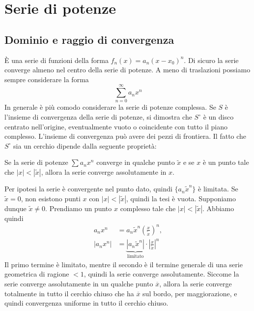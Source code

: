 \documentclass[a4paper]{article}
\begin{document}
\pagebreak

\section{Serie di potenze}

\subsection{Dominio e raggio di convergenza}

\begin{radioactive}
È una serie di funzioni della forma \(f_n(x) = a_n(x-x_0)^n\).
Di sicuro la serie converge almeno nel centro della serie di potenze.
A meno di traslazioni possiamo sempre considerare la forma
\[
    \sum_{n=0}^\infty a_n x^n
\]
In generale è più comodo considerare la serie di potenze complessa.
Se \(S\) è l'insieme di convergenza della serie di potenze,
si dimostra che \(S^\circ\) è un disco centrato nell'origine, eventualmente vuoto o coincidente con tutto il piano complesso.
L'insieme di convergenza può avere dei pezzi di frontiera.
Il fatto che \(S^\circ\)
sia un cerchio dipende dalla seguente proprietà:
\end{radioactive}

\begin{radioactive}
\begin{snippetproposition}{}
    Se la serie di potenze \(\sum a_nx^n\) converge in qualche punto \(\tilde x\)
    e se \(x\) è un punto tale che \(|x| < |\tilde x|\),
    allora la serie converge assolutamente in \(x\).
\end{snippetproposition}
\end{radioactive}

\begin{radioactive}
\begin{snippetproof}{}
    Per ipotesi la serie è convergente nel punto dato, quindi
    \(\{a_n \tilde x^n\}\) è limitata.
    Se \(\tilde x=0\), non esistono punti \(x\) con \(|x|<|\tilde x|\), quindi la tesi è vuota.
    Supponiamo dunque \(\tilde x\neq0\).
    Prendiamo un punto \(x\) complesso tale che \(|x| < |\tilde x|\).
    Abbiamo quindi
    \begin{align*}
        a_nx^n&=a_n\tilde x^n\left(\frac{x}{\tilde x}\right)^n, \\
        |a_n x^n| &= \underbrace{|a_n\tilde x^n|}_{\text{limitato}} \cdot \left|\frac{
            x
        }{
            \tilde x
        }\right|^n
    \end{align*}
    Il primo termine è limitato, mentre il secondo è il termine generale di una serie geometrica di ragione
    \(<1\), quindi la serie converge assolutamente.
    Siccome la serie converge assolutamente in un qualche punto \(\overline x\),
    allora la serie converge totalmente in tutto il cerchio chiuso che ha \(\overline x\)
    sul bordo, per maggiorazione, e quindi convergenza uniforme in tutto il cerchio chiuso.
\end{snippetproof}
\end{radioactive}
\end{document}
